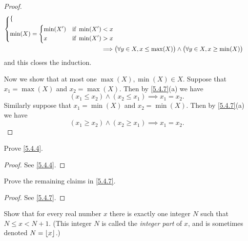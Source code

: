 \begin{proof}
\begin{align*}
\begin{dcases}
\begin{dcases}
                \end{dcases} \\
                 \min(X) = \begin{dcases}
                  \min(X') & \text{if } \min(X') < x \\
                  x        & \text{if } \min(X') > x
                \end{dcases}
               \end{dcases}                                                                                                        \\
    \implies & \big(\forall y \in X, x \leq \max(X)\big) \land \big(\forall y \in X, x \geq \min(X)\big)
  \end{align*}
  and this closes the induction.

  Now we show that at most one \(\max(X), \min(X) \in X\).
  Suppose that \(x_1 = \max(X)\) and \(x_2 = \max(X)\).
  Then by \cref{5.4.7}(a) we have
  \[
    (x_1 \leq x_2) \land (x_2 \leq x_1) \implies x_1 = x_2.
  \]
  Similarly suppose that \(x_1 = \min(X)\) and \(x_2 = \min(X)\).
  Then by \cref{5.4.7}(a) we have
  \[
    (x_1 \geq x_2) \land (x_2 \geq x_1) \implies x_1 = x_2.
  \]
\end{proof}

\exercisesection

\begin{ex}\label{ex:5.4.1}
  Prove \cref{5.4.4}.
\end{ex}

\begin{proof}
  See \cref{5.4.4}.
\end{proof}

\begin{ex}\label{ex:5.4.2}
  Prove the remaining claims in \cref{5.4.7}.
\end{ex}

\begin{proof}
  See \cref{5.4.7}.
\end{proof}

\begin{ex}\label{ex:5.4.3}
  Show that for every real number \(x\) there is exactly one integer \(N\) such that \(N \leq x < N + 1\).
  (This integer \(N\) is called the \emph{integer part} of \(x\), and is sometimes denoted \(N = \left\lfloor x\right\rfloor\).)
\end{ex}

